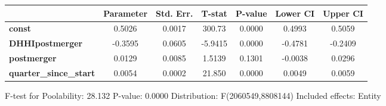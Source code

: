 \documentclass{report}
\begin{document}
\begin{center}
\begin{tabular}{lcccccc}
                               & \textbf{Parameter} & \textbf{Std. Err.} & \textbf{T-stat} & \textbf{P-value} & \textbf{Lower CI} & \textbf{Upper CI}  \\
\midrule
\textbf{const}                 &       0.5026       &       0.0017       &      300.73     &      0.0000      &       0.4993      &       0.5059       \\
\textbf{DHHIpostmerger}        &      -0.3595       &       0.0605       &     -5.9415     &      0.0000      &      -0.4781      &      -0.2409       \\
\textbf{postmerger}            &       0.0129       &       0.0085       &      1.5139     &      0.1301      &      -0.0038      &       0.0296       \\
\textbf{quarter\_since\_start} &       0.0054       &       0.0002       &      21.850     &      0.0000      &       0.0049      &       0.0059       \\
\bottomrule
\end{tabular}
\end{center}

F-test for Poolability: 28.132 \newline
 P-value: 0.0000 \newline
 Distribution: F(2060549,8808144) \newline
  \newline
 Included effects: Entity
\end{document}
